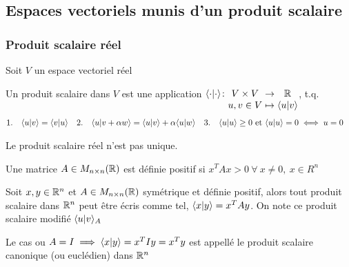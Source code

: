 \subsection{Espaces vectoriels munis d'un produit scalaire}

\subsubsection{Produit scalaire réel}
Soit $V$ un espace vectoriel réel
\begin{definition}
      \label{scpr_Real}
      Un produit scalaire dans $V$ est une application $\myfunc{\scpr{\cdot}{\cdot}}{V \times V}{\R}{u, v \in V}{\scpr{u}{v}}$, t.q.
      \begin{align*}
            &1. \quad \langle u \lvert v \rangle = \langle v \lvert u \rangle& &2. \quad \langle u \lvert v + \alpha w \rangle = \langle u \lvert v \rangle + \alpha \langle u \lvert w \rangle& &3. \quad \langle u \lvert u \rangle \geq 0 \ \text{et} \ \langle u \lvert u \rangle = 0 \iff u = 0&
      \end{align*}
\end{definition}
\begin{remark}
      Le produit scalaire réel n'est pas unique. 
\end{remark}
\begin{definition}
      Une matrice $A \in M_{n \times n}(\mathbb{R})$ est définie positif si $x^T A x > 0 \ \forall \ x \neq 0, \ x \in R^n$
\end{definition}
\begin{lemma}
      Soit $x,y \in \mathbb{R}^n$ et $A \in M_{n \times n}(\mathbb{R})$ symétrique et définie positif, alors tout produit scalaire dans $\mathbb{R}^n$ 
      peut être écris comme tel, $\langle x \lvert y \rangle = x^T A y$. On note ce produit scalaire modifié $\langle u \lvert v \rangle_A$
\end{lemma}
\begin{definition}
      Le cas ou $A = I \implies \langle x \lvert y \rangle = x^T I y = x^T y$ est appellé le produit scalaire 
      canonique (ou euclédien) dans $\mathbb{R}^n$
\end{definition}

